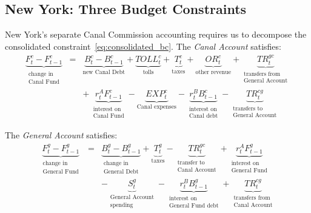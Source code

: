 \documentclass[11pt]{article}
\begin{document}
\subsection{New York: Three Budget Constraints}

New York's separate Canal Commission accounting requires us to decompose the
consolidated constraint~\eqref{eq:consolidated_bc}.  The \emph{Canal Account}
satisfies:
\begin{eqnarray}
\underbrace{F^c_t - F^c_{t-1}}_{\substack{\text{change in}\\ \text{Canal Fund}}}
  &=& \underbrace{B^c_t - B^c_{t-1}}_{\text{new Canal Debt}}
    + \underbrace{TOLL^c_t}_{\text{tolls}}
    + \underbrace{T^c_t}_{\text{taxes}}
    + \underbrace{OR^c_t}_{\text{other revenue}}
    + \underbrace{TR^{gc}_t}_{\substack{\text{transfers from}\\ \text{General Account}}}
    \nonumber \\
  &&
    + \, \underbrace{r_t^A F^c_{t-1}}_{\substack{\text{interest on}\\ \text{Canal Fund}}}
    - \underbrace{EXP^c_t}_{\text{Canal expenses}}
    - \underbrace{r_t^B B^c_{t-1}}_{\substack{\text{interest on}\\ \text{Canal debt}}}
    - \underbrace{TR^{cg}_t}_{\substack{\text{transfers to}\\ \text{General Account}}}
\label{eq:canal_bc}
\end{eqnarray}

The \emph{General Account} satisfies:
\begin{eqnarray}
\underbrace{F^g_t - F^g_{t-1}}_{\substack{\text{change in}\\ \text{General Fund}}}
  &=& \underbrace{B^g_t - B^g_{t-1}}_{\substack{\text{change in}\\ \text{General Debt}}}
    + \underbrace{T^g_t}_{\text{taxes}}
    - \underbrace{TR^{gc}_t}_{\substack{\text{transfer to}\\ \text{Canal Account}}}
    + \underbrace{r_t^A F^g_{t-1}}_{\substack{\text{interest on}\\ \text{General Fund}}}
    \nonumber \\
  &&
    - \underbrace{S^g_t}_{\substack{\text{General Account}\\ \text{spending}}}
    - \underbrace{r_t^B B^g_{t-1}}_{\substack{\text{interest on}\\ \text{General Fund debt}}}
    + \underbrace{TR^{cg}_t}_{\substack{\text{transfers from}\\ \text{Canal Account}}}
\label{eq:general_bc}
\end{eqnarray}
\end{document}
